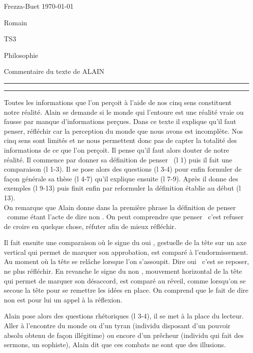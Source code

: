 \documentclass[a4paper,11pt]{article}
\begin{document}
\centerline{Frezza-Buet \hfill \today}
\centerline{Romain \hfill}
\centerline{TS3 \hfill}

\centerline{Philosophie}
\centerline{\sc \large Commentaire du texte de ALAIN}
\vspace{1cm}

\hrule
\vspace{4cm}
\hrule
\vspace{1cm}

Toutes les informations que l'on perçoit à l'aide de nos cinq sens constituent notre réalité. Alain se demande si le monde qui l'entoure est une réalité vraie ou fausse par manque d'informations perçues. Dans ce texte il explique qu'il faut penser, réfléchir car la perception du monde que nous avons est incomplète. Nos cinq sens sont limités et ne nous permettent donc pas de capter la totalité des informations de ce que l'on perçoit. Il pense qu'il faut alors douter de notre réalité. Il commence par donner sa définition de \og penser \fg\ (l 1) puis il fait une comparaison (l 1-3). Il se pose alors des questions (l 3-4) pour enfin formuler de façon générale sa thèse (l 4-7) qu'il explique ensuite (l 7-9). Après il donne des exemples (l 9-13) puis finit enfin par reformuler la définition établie au début (l 13).\\

On remarque que Alain donne dans la première phrase la définition de \og penser \fg\ comme étant l'acte de dire \og non \fg. On peut comprendre que \og penser \fg\ c'est refuser de croire en quelque chose, réfuter afin de mieux réfléchir.

Il fait ensuite une comparaison où le signe du \og oui \fg, gestuelle de la tête sur un axe vertical qui permet de marquer son approbation, est comparé à l'endormissement. Au moment où la tête se relâche lorsque l'on s'assoupit. Dire \og oui \fg\ c'est se reposer, ne plus réfléchir. En revanche le signe du  \og non \fg, mouvement horizontal de la tête qui permet de marquer son désaccord, est comparé au réveil, comme lorsqu'on se secoue la tête pour se remettre les idées en place. On comprend que le fait de dire non est pour lui un appel à la réflexion.

Alain pose alors des questions rhétoriques (l 3-4), il se met à la place du lecteur. Aller à l'encontre du monde ou d'un tyran (individu disposant d'un pouvoir absolu obtenu de façon illégitime) ou encore d'un prêcheur (individu qui fait des sermons, un sophiste), Alain dit que ces combats ne sont que des illusions.
\end{document}
